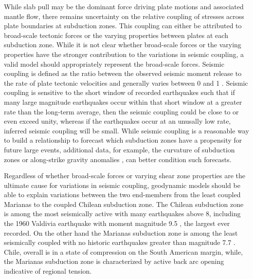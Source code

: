 \documentclass[12pt]{article}
\begin{document}
While slab pull may be the dominant force driving plate motions and associated mantle flow, there remains uncertainty on the relative coupling of stresses across plate boundaries at subduction zones. This coupling can either be attributed to broad-scale tectonic forces or the varying properties between plates at each subduction zone. While it is not clear whether broad-scale forces or the varying properties have the stronger contribution to the variations in seismic coupling, a valid model should appropriately represent the broad-scale forces. 
Seismic coupling is defined as the ratio between the observed seismic moment release to the rate of plate tectonic velocities and generally varies between 0 and 1 \citep{davies1971regional}. 
Seismic coupling is sensitive to the short window of recorded earthquakes such that if many large magnitude earthquakes occur within that short window 
at a greater rate than the long-term average, then the seismic coupling could be close to or even exceed unity, whereas if the earthquakes occur at an unusally low rate, inferred seismic coupling will be small.  While seismic coupling is a reasonable way to build a relationship to forecast which subduction zones have a propensity for future large events, additional data, for example, the curvature of subduction zones \citep{bletery2016mega} or along-strike gravity anomalies \citep{song2003large}, 
can better condition such forecasts. 


Regardless of whether broad-scale forces or varying shear zone properties are the ultimate cause for variations in seismic coupling, geodynamic models should be able to explain variations between the two end-members from the least coupled Marianas to the coupled Chilean subduction zone. 
The Chilean subduction zone is among the most seismically active with many earthquakes above 8, including the 1960 Valdivia earthquake with moment magnitude 9.5 \citep{kanamori1974},
the largest ever recorded. 
On the other hand the Marianas subduction zone is among the least seismically coupled with no historic earthquakes greater than magnitude 7.7 \citep{mccaffrey2008global}. 
Chile, overall is in a state of compression on the South American margin, while, the Marianas subduction zone is characterized by active back arc opening indicative of regional tension.
\end{document}
